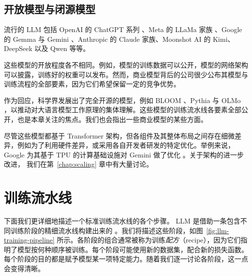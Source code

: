 \subsection{开放模型与闭源模型} 
\label{sec:pipeline-models}
流行的 LLM 包括 OpenAI 的 ChatGPT 系列 \citep{achiam2023gpt,ouyang2022training}、Meta 的 LLaMa 家族 \citep{touvron2023llama}、Google 的 Gemma \citep{chowdhery2023palm} 与 Gemini
\citep{team2023gemini}、Anthropic 的 Claude 家族、Moonshot AI 的 Kimi、DeepSeek \citep{guo2025deepseek} 以及 Qwen \citep{bai2025qwen2} 等等。

这些模型的开放程度各不相同。例如，模型的训练数据可以公开，模型的网络架构可以披露，训练好的权重可以发布。然而，商业模型背后的公司很少公布其模型与训练流程的全部要素，因为它们希望保留一定的竞争优势。

作为回应，科学界发展出了完全开源的模型，例如 BLOOM \citep{le2023bloom}、Pythia \citep{biderman2023pythia} 与 OLMo \citep{groeneveld2024olmoacceleratingsciencelanguage}，以推动对大语言模型工作原理的集体理解。这些模型的训练流水线各要素全部公开，也是本章关注的焦点。我们也会指出一些商业模型的某些方面。

尽管这些模型都基于 Transformer 架构，但各组件及其整体布局之间存在细微差异，例如为了利用硬件差异，或采用各自开发者研发的特定优化。举例来说，Google 为其基于 TPU 的计算基础设施对 Gemini 做了优化 \citep{jouppi2023tpu}。关于架构的进一步改进，%
我们在第~\ref{chap:scaling} 章中有大量讨论。



\section{训练流水线}
\label{sec:pipeline-training}
下面我们更详细地描述一个标准训练流水线的各个步骤。
LLM 是借助一条包含不同训练阶段的精细流水线构建出来的 \citep{radford2019language,minaee2024large}。我们将描述这些阶段，如图~\ref{fig:llm-training-pipeline} 所示。各阶段的组合通常被称为训练{\em 配方}（recipe），因为它们指明了模型按何种顺序被训练。每个阶段可能使用新的数据集，配合新的损失函数。每个阶段的目的都是赋予模型某一项特定能力。随着我们逐一讨论各阶段，这一点会变得清晰。



